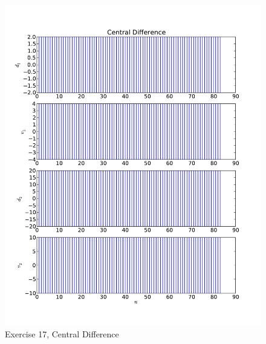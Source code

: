 \documentclass[12pt]{article}
\begin{document}
\begin{figure}[h!]
\centering
\includegraphics[height=0.9\textheight]{cd2.pdf}
\caption{Exercise 17, Central Difference}
\end{figure}
\end{document}
